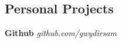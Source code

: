 \documentclass[margin,line,12pt]{res}
\begin{document}
{\begin{resume}


\vspace*{.20in}
{\color{Black}
  \vspace{-.13in}
  \section{\sc Personal Projects}}
\color{black}

{\bf Github } {\em github.com/gwydirsam}  \



\end{resume}}
\end{document}
